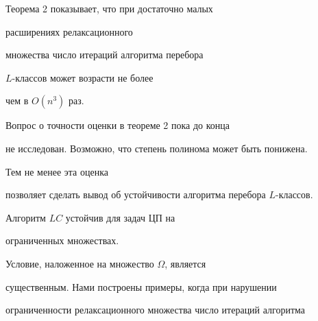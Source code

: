 







Теорема 2 показывает, что при достаточно малых 


расширениях релаксационного


множества число итераций алгоритма перебора


$L$-классов может возрасти не более


чем в $O(n^{3})$ раз.





Вопрос о точности оценки в теореме 2 пока до конца 


не исследован. Возможно, что степень полинома может быть понижена.


Тем не менее эта оценка


позволяет сделать вывод об устойчивости алгоритма перебора $L$-классов.








\begin{cor}


Алгоритм $LC$ устойчив для задач ЦП на


ограниченных множествах.


\end{cor}





Условие,  наложенное на множество $ \Omega$,  является


существенным. Нами построены примеры, когда при нарушении 


ограниченности релаксационного множества число итераций алгоритма


